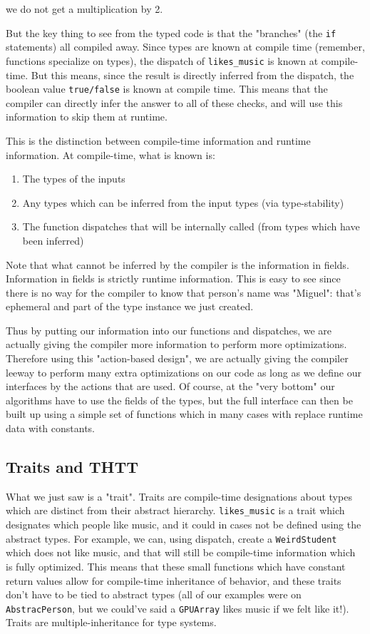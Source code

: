 \documentclass[11pt]{article}
\begin{document}
we do not get a multiplication by 2.

    But the key thing to see from the typed code is that the "branches" (the
\texttt{if} statements) all compiled away. Since types are known at
compile time (remember, functions specialize on types), the dispatch of
\texttt{likes\_music} is known at compile-time. But this means, since
the result is directly inferred from the dispatch, the boolean value
\texttt{true/false} is known at compile time. This means that the
compiler can directly infer the answer to all of these checks, and will
use this information to skip them at runtime.

This is the distinction between compile-time information and runtime
information. At compile-time, what is known is:

\begin{enumerate}
\def\labelenumi{\arabic{enumi})}
\item
  The types of the inputs
\item
  Any types which can be inferred from the input types (via
  type-stability)
\item
  The function dispatches that will be internally called (from types
  which have been inferred)
\end{enumerate}

Note that what cannot be inferred by the compiler is the information in
fields. Information in fields is strictly runtime information. This is
easy to see since there is no way for the compiler to know that person's
name was "Miguel": that's ephemeral and part of the type instance we
just created.

Thus by putting our information into our functions and dispatches, we
are actually giving the compiler more information to perform more
optimizations. Therefore using this "action-based design", we are
actually giving the compiler leeway to perform many extra optimizations
on our code as long as we define our interfaces by the actions that are
used. Of course, at the "very bottom" our algorithms have to use the
fields of the types, but the full interface can then be built up using a
simple set of functions which in many cases with replace runtime data
with constants.

    \subsection{Traits and THTT}\label{traits-and-thtt}

    What we just saw is a "trait". Traits are compile-time designations
about types which are distinct from their abstract hierarchy.
\texttt{likes\_music} is a trait which designates which people like
music, and it could in cases not be defined using the abstract types.
For example, we can, using dispatch, create a \texttt{WeirdStudent}
which does not like music, and that will still be compile-time
information which is fully optimized. This means that these small
functions which have constant return values allow for compile-time
inheritance of behavior, and these traits don't have to be tied to
abstract types (all of our examples were on \texttt{AbstracPerson}, but
we could've said a \texttt{GPUArray} likes music if we felt like it!).
Traits are multiple-inheritance for type systems.
\end{document}
